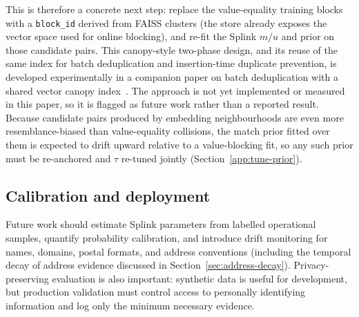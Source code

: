 \documentclass[11pt]{article}
\begin{document}
This is therefore a concrete next step: replace the value-equality training blocks with a \texttt{block\_id} derived from FAISS clusters (the store already exposes the vector space used for online blocking), and re-fit the Splink $m/u$ and prior on those candidate pairs. This canopy-style two-phase design, and its reuse of the same index for batch deduplication and insertion-time duplicate prevention, is developed experimentally in a companion paper on batch deduplication with a shared vector canopy index~\cite{vectordedupbatch}. The approach is not yet implemented or measured in this paper, so it is flagged as future work rather than a reported result. Because candidate pairs produced by embedding neighbourhoods are even more resemblance-biased than value-equality collisions, the match prior fitted over them is expected to drift upward relative to a value-blocking fit, so any such prior must be re-anchored and $\tau$ re-tuned jointly (Section~\ref{app:tune-prior}).

\subsection{Calibration and deployment}
Future work should estimate Splink parameters from labelled operational samples, quantify probability calibration, and introduce drift monitoring for names, domains, postal formats, and address conventions (including the temporal decay of address evidence discussed in Section~\ref{sec:address-decay}). Privacy-preserving evaluation is also important: synthetic data is useful for development, but production validation must control access to personally identifying information and log only the minimum necessary evidence.
\end{document}
